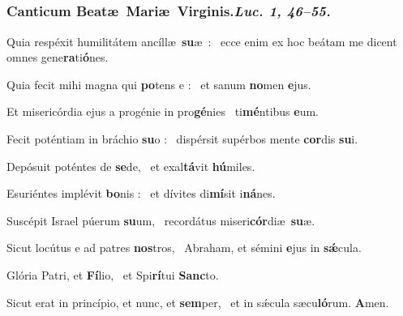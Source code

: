 \documentclass[12pt]{article} %
\newenvironment{psalmtext}{\leftskip 0.25in}{\vspace{2 mm}}
\let\oldgresixstar\gresixstar
\renewcommand{\gresixstar}{\textcolor{benred8}{\oldgresixstar}}
\def\capitulumSpace{\hspace{20 mm}}
\begin{document}
\subsection*{}

\subsubsection*{Canticum Beat\ae\ Mari\ae\ Virginis.\capitulumSpace \emph{Luc. 1, 46--55.}}


\gresetfirstlineaboveinitial{\small \textsc{ \textbf{\textcolor{benred8}{V a}}}}{\small \textsc{ \textbf{\textcolor{benred8}{V a}}}}

\begin{psalmtext}
Quia resp\'{e}xit humilit\'{a}tem anc\'{i}ll\ae\ \textbf{su}\ae\ : \gresixstar\ ecce enim ex hoc be\'{a}tam me dicent omnes gene\textbf{ra}ti\textbf{\'{o}}nes.

Quia fecit mihi magna qui \textbf{po}tens e : \gresixstar\ et sanum \textbf{no}men \textbf{e}jus.

Et miseric\'{o}rdia ejus a prog\'{e}nie in pro\textbf{g\'{e}}nies \gresixstar\ ti\textbf{m\'{e}}ntibus \textbf{e}um.

Fecit pot\'{e}ntiam in br\'{a}chio \textbf{su}o : \gresixstar\ disp\'{e}rsit sup\'{e}rbos mente \textbf{cor}dis \textbf{su}i.

Dep\'{o}suit pot\'{e}ntes de \textbf{se}de, \gresixstar\ et exal\textbf{t\'{a}}vit \textbf{h\'{u}}miles.

Esuri\'{e}ntes impl\'{e}vit \textbf{bo}nis : \gresixstar\ et d\'{i}vites di\textbf{m\'{i}}sit i\textbf{n\'{a}}nes.

Susc\'{e}pit Israel p\'{u}erum \textbf{su}um, \gresixstar\ record\'{a}tus miseri\textbf{c\'{o}r}di\ae\ \textbf{su}\ae.

Sicut loc\'{u}tus e ad patres \textbf{nos}tros, \gresixstar\ Abraham, et s\'{e}mini \textbf{e}jus in \textbf{s\'{\ae}}cula.

Glória Patri, et \textbf{Fí}lio, \gresixstar\ et Spi\textbf{rí}tui \textbf{Sanc}to.

Sicut erat in princípio, et nunc, et \textbf{sem}per, \gresixstar\ et in sǽcula sæcu\textbf{ló}rum. \textbf{A}men.

\end{psalmtext}
\end{document}
